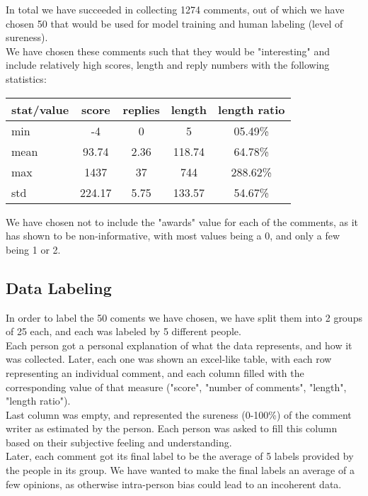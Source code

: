 \documentclass[11pt, oneside]{article}   	%
\begin{document}
In total we have succeeded in collecting 1274 comments, out of which we have chosen 50 that would be used for model training and human labeling (level of sureness).\\
We have chosen these comments such that they would be "interesting" and include relatively high scores, length and reply numbers with the following statistics:\\
\begin{center}
	\begin{tabular}{|l|c|c|c|c|}
		\hline
		stat/value & score & replies & length & length ratio\\
		\hline
		min & -4 & 0 & 5 & 05.49\% \\
		mean & 93.74 & 2.36 & 118.74 & 64.78\% \\
		max & 1437 & 37 & 744 & 288.62\% \\
		std & 224.17 & 5.75 & 133.57 & 54.67\%\\
		\hline
	\end{tabular}
\end{center}

We have chosen not to include the "awards" value for each of the comments, as it has shown to be non-informative, with most values being a 0, and only a few being 1 or 2.\\

\subsection{Data Labeling}
In order to label the 50 coments we have chosen, we have split them into 2 groups of 25 each, and each was labeled by 5 different people.\\

Each person got a personal explanation of what the data represents, and how it was collected. Later, each one was shown an excel-like table, with each row representing an individual comment, and each column filled with the corresponding value of that measure ("score", "number of comments", "length", "length ratio").\\
Last column was empty, and represented the sureness (0-100\%) of the comment writer as estimated by the person. Each person was asked to fill this column based on their subjective feeling and understanding.\\

Later, each comment got its final label to be the average of 5 labels provided by the people in its group.
We have wanted to make the final labels an average of a few opinions, as otherwise intra-person bias could lead to an incoherent data.
\end{document}
